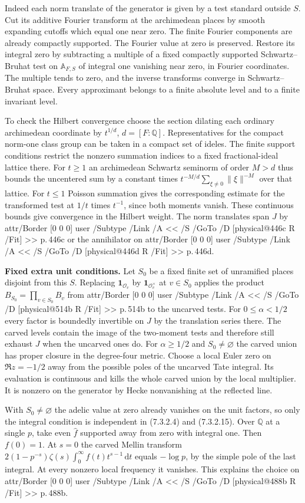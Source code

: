 \documentclass[11pt,letterpaper]{article}
\makeatletter
\newcommand{\point}[1]{\par\smallskip\textbf{#1.}\enspace\ignorespaces}
\newcommand{\Q}{\mathbb Q}
\newcommand{\A}{\mathbb A}
\newcommand{\dd}{\,\mathrm d}
\newcommand{\MusicPDFPageRef}[1]{\pdfpageref\csname physical@#1\endcsname\space\space 0 R}
\newcommand{\pagelink}[2]{\leavevmode\pdfstartlink attr{/Border [0 0 0]} user{%
  /Subtype /Link /A << /S /GoTo /D [\MusicPDFPageRef{#1} /Fit] >>}%
  {\color{ink}#2}\pdfendlink}
\newcommand{\pg}[1]{\pagelink{#1}{p.\,#1}}
\makeatother
\begin{document}
Indeed each norm translate of the generator is given by a test standard
outside $S$. Cut its additive Fourier transform at the archimedean
places by smooth expanding cutoffs which equal one near zero. The finite
Fourier components are already compactly supported. The Fourier value at
zero is preserved. Restore its integral zero by subtracting a multiple
of a fixed compactly supported Schwartz--Bruhat test on $\A_{F,S}$ of
integral one vanishing near zero, in Fourier coordinates. The multiple
tends to zero, and the inverse transforms converge in Schwartz--Bruhat
space. Every approximant belongs to a finite absolute level and to a
finite invariant level.

To check the Hilbert convergence choose the section dilating each ordinary
archimedean coordinate by $t^{1/d}$, $d=[F:\Q]$. Representatives for
the compact norm-one class group can be taken in a compact set of
ideles. The finite support conditions restrict the nonzero summation
indices to a fixed fractional-ideal lattice there. For $t\ge1$ an
archimedean Schwartz seminorm of order $M>d$ thus bounds the uncentered
sum by a constant times $t^{-M/d}\sum_{\xi\ne0}\|\xi\|^{-M}$ over that
lattice. For $t\le1$ Poisson summation gives the corresponding estimate
for the transformed test at $1/t$ times $t^{-1}$, since both moments
vanish. These continuous bounds give convergence in the Hilbert weight.
The norm translates span $J$ by \pg{446c} or the annihilator on \pg{446d}.

\point{Fixed extra unit conditions} Let $S_0$ be a fixed finite set of
unramified places disjoint from this $S$. Replacing $\mathbf1_{\mathcal O_v}$
by $\mathbf1_{\mathcal O_v^\times}$ at $v\in S_0$ applies the product
$B_{S_0}=\prod_{v\in S_0}B_v$ from \pg{514b} to the uncarved tests.
For $0\le\alpha<1/2$ every factor is boundedly invertible on $J$ by
the translation series there. The carved levels contain the image of
the two-moment tests and therefore still exhaust $J$ when the uncarved
ones do. For $\alpha\ge1/2$ and $S_0\ne\varnothing$ the carved union
has proper closure in the degree-four metric. Choose a local Euler zero
on $\Re z=-1/2$ away from the possible poles of the uncarved Tate
integral. Its evaluation is continuous and kills the whole carved
union by the local multiplier. It is nonzero on the generator by Hecke
nonvanishing at the reflected line.

With $S_0\ne\varnothing$ the adelic value at zero already vanishes on
the unit factors, so only the integral condition is independent in
(7.3.2.4) and (7.3.2.15). Over $\Q$ at a single $p$, take even
$\widehat f$ supported away from zero with integral one. Then $f(0)=1$.
At $s=0$ the carved Mellin transform
$2(1-p^{-s})\zeta(s)\int_0^\infty f(t)t^{s-1}\dd t$ equals
$-\log p$, by the simple pole of the last integral. At every nonzero
local frequency it vanishes. This explains the choice on \pg{488b}.
\end{document}
